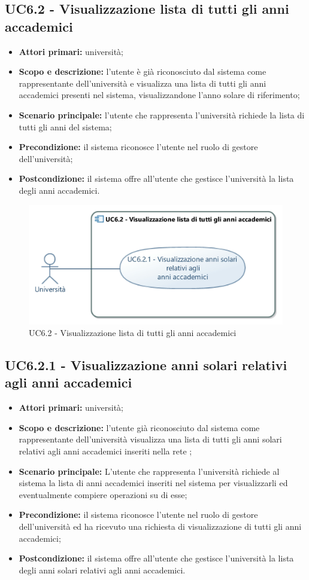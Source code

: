 \documentclass[AnalisiDeiRequisiti.tex]{subfiles}
\begin{document}
\subsection{UC6.2 - Visualizzazione lista di tutti gli anni accademici}
\begin{itemize}
	\item \textbf{Attori primari:} università;
	\item \textbf{Scopo e descrizione:} l'utente è già riconosciuto dal sistema come rappresentante dell'università e visualizza una lista di tutti gli anni accademici presenti nel sistema, visualizzandone l'anno solare di riferimento;
	\item \textbf{Scenario principale:} l'utente che rappresenta l'università richiede la lista di tutti gli anni del sistema;
	\item \textbf{Precondizione:} il sistema riconosce l'utente nel ruolo di gestore dell'università;
	\item \textbf{Postcondizione:} il sistema offre all'utente che gestisce l'università la lista degli anni accademici.
\end{itemize}
\begin{figure}[H]
	\centering
	\includegraphics[width=0.7\linewidth]{UC6_2.jpg}
	\caption{UC6.2 - Visualizzazione lista di tutti gli anni accademici}
	\label{fig:UC6.2 - Visualizzazione lista di tutti gli anni accademici}
\end{figure}
\subsection{UC6.2.1 - Visualizzazione anni solari relativi agli anni accademici}
\begin{itemize}
	\item \textbf{Attori primari:} università;
	\item \textbf{Scopo e descrizione:} l'utente già riconosciuto dal sistema come rappresentante dell'università visualizza una lista di tutti gli anni solari relativi agli anni accademici inseriti nella rete ;
	\item \textbf{Scenario principale:} L'utente che rappresenta l'università richiede al sistema la lista di anni accademici inseriti nel sistema per visualizzarli ed eventualmente compiere operazioni su di esse;
	\item \textbf{Precondizione:} il sistema riconosce l'utente nel ruolo di gestore dell'università ed ha ricevuto una richiesta di visualizzazione di tutti gli anni accademici;
	\item \textbf{Postcondizione:} il sistema offre all'utente che gestisce l'università la lista degli anni solari relativi agli anni accademici.
\end{itemize}
\end{document}
